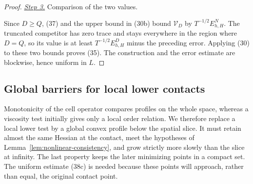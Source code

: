 \documentclass{smfart}
\theoremstyle{definition}
\newcommand{\1}{\mathbf 1}
\begin{document}
\begin{proof}
\smallskip\noindent
\underline{\textit{Step 3.}} Comparison of the two values.

Since $D\geq Q$, (37) and the upper bound in (30b) bound
$\mathcal V_D$ by $T^{-1/2}E_{h,H}^N$.  The truncated competitor has
zero trace and stays everywhere in the region where $D=Q$, so its
value is at least $T^{-1/2}E_{h,H}^D$ minus the preceding error.
Applying (30) to these two bounds proves (35).  The construction and
the error estimate are blockwise, hence uniform in $L$.

\end{proof}

\subsection{Global barriers for local lower contacts}

Monotonicity of the cell operator compares profiles on the whole
space, whereas a viscosity test initially gives only a local order
relation.  We therefore replace a local lower test by a global convex
profile below the spatial slice.  It must retain almost the same
Hessian at the contact, meet the hypotheses of
Lemma~\ref{lem:nonlinear-consistency}, and grow strictly more slowly
than the slice at infinity.  The last property keeps the later
minimizing points in a compact set.  The uniform estimate (38c) is
needed because these points will approach, rather than equal, the
original contact point.
\end{document}
